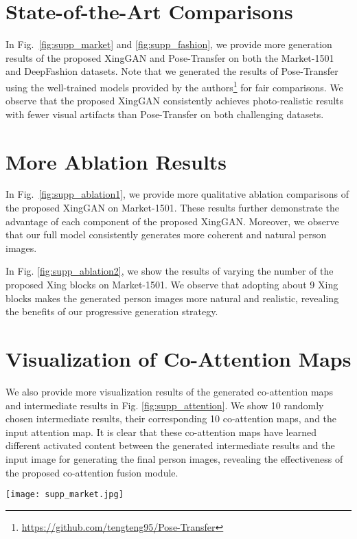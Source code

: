 \documentclass[runningheads]{llncs}
\begin{document}
\section{State-of-the-Art Comparisons}
\label{sec:1}
In Fig.~\ref{fig:supp_market} and \ref{fig:supp_fashion}, we provide more generation results of the proposed XingGAN  and Pose-Transfer \cite{zhu2019progressive} on both  the Market-1501 \cite{zheng2015scalable} and DeepFashion \cite{liu2016deepfashion} datasets. Note that  we generated the results of Pose-Transfer \cite{zhu2019progressive} using the well-trained models provided by the authors\footnote{\url{https://github.com/tengteng95/Pose-Transfer}} for fair comparisons. We observe that the proposed XingGAN consistently achieves  photo-realistic results with fewer visual artifacts than Pose-Transfer on both challenging datasets. 

\section{More Ablation Results}
\label{sec:2}
In Fig.~\ref{fig:supp_ablation1}, we provide more qualitative ablation comparisons of the proposed XingGAN on Market-1501. 
These results further demonstrate the advantage of each component of the proposed XingGAN.
Moreover, we observe that our full model consistently generates more coherent and natural person images.

In Fig. \ref{fig:supp_ablation2}, we show the results of varying the number of the proposed Xing blocks on Market-1501.
We observe that adopting  about 9 Xing blocks makes the generated person images more natural and realistic, revealing the benefits of our progressive generation strategy.

\section{Visualization of Co-Attention Maps}
\label{sec:3}
We also provide more visualization results of the generated co-attention maps and intermediate results in Fig. \ref{fig:supp_attention}.
We show 10 randomly chosen intermediate results, their corresponding 10 co-attention maps, and the input attention map.
It is clear that these co-attention maps have learned different activated content between the generated intermediate results and the input image for generating the final person images, revealing the effectiveness of the proposed co-attention fusion  module.

\begin{figure*}[t] 
	\centering
	\texttt{[image: supp\_market.jpg]}
	\caption{Qualitative comparison with Pose-Transfer~\cite{zhu2019progressive} on Market-1501.
	}
	\label{fig:supp_market}
\end{figure*}
\end{document}
